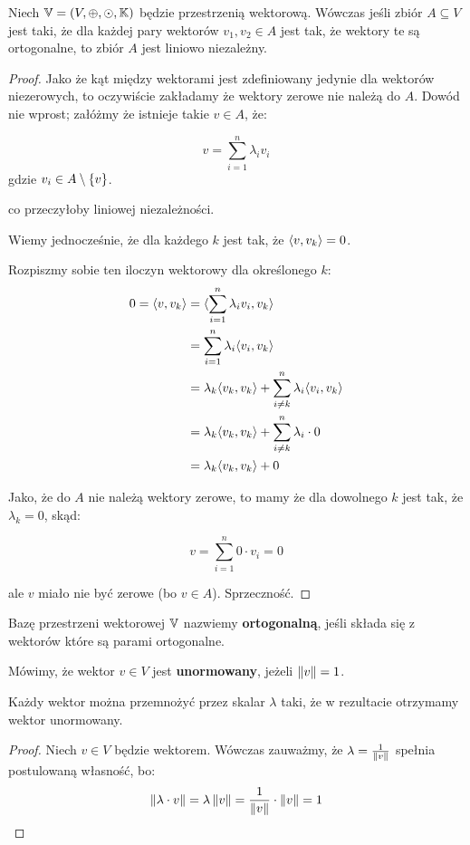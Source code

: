 \begin{theorem}
Niech \(\mathbb{V} = (V, \oplus, \odot, \mathbb{K})\) będzie przestrzenią wektorową. Wówczas jeśli zbiór \( A \subseteq V\) jest taki, że dla każdej pary wektorów \(v_1, v_2 \in A\) jest tak, że wektory te są ortogonalne, to zbiór \(A\) jest liniowo niezależny.
\end{theorem}
\begin{proof} 
Jako że kąt między wektorami jest zdefiniowany jedynie dla wektorów niezerowych, to oczywiście zakładamy że wektory zerowe nie należą do \(A\).
Dowód nie wprost; załóżmy że istnieje takie \(v \in A\), że: 

\[ 
    v = \sum_{i=1}^{n} \lambda_i v_i
\]
gdzie \(v_i \in A \setminus \set{v}\).

co przeczyłoby liniowej niezależności.

Wiemy jednocześnie, że dla każdego \(k\) jest tak, że \(\langle v, v_k \rangle = 0\). 

Rozpiszmy sobie ten iloczyn wektorowy dla określonego \(k\):
\begin{align*}
    0 = \langle v, v_k \rangle &= \langle \sum_{i=1}^{n} \lambda_i v_i, v_k \rangle \\ 
    &= \sum_{i=1}^{n} \lambda_i \langle v_i, v_k \rangle \\ 
    &= \lambda_k \langle v_k, v_k \rangle + \sum_{i \not = k}^{n} \lambda_i \langle v_i, v_k \rangle \\ 
    &= \lambda_k \langle v_k, v_k \rangle + \sum_{i \not = k}^{n} \lambda_i \cdot 0 \\ 
    &= \lambda_k \langle v_k, v_k \rangle + 0 \\ 
\end{align*}

Jako, że do \(A\) nie należą wektory zerowe, to mamy że dla dowolnego \(k\) jest tak, że \(\lambda_k = 0\), skąd:

\[ 
    v = \sum_{i=1}^{n} 0 \cdot v_i = 0
\]

ale \(v\) miało nie być zerowe (bo \(v \in A\)). Sprzeczność.

\end{proof}

\begin{definition}
Bazę przestrzeni wektorowej \(\mathbb{V}\) nazwiemy \textbf{ortogonalną}, jeśli składa się z wektorów które są parami ortogonalne.
\end{definition}

\begin{definition}
Mówimy, że wektor \(v \in V\) jest \textbf{unormowany}, jeżeli \(\left\Vert v \right\Vert = 1\).
\end{definition}
\begin{fact}
Każdy wektor można przemnożyć przez skalar \(\lambda\) taki, że w rezultacie otrzymamy wektor unormowany. 
\end{fact}
\begin{proof}
Niech \(v \in V\) będzie wektorem. Wówczas zauważmy, że \(\lambda = \frac{1}{\left\Vert v \right\Vert}\) spełnia postulowaną własność, bo:
\[
    \left\Vert \lambda \cdot v \right\Vert = \lambda \left\Vert v \right\Vert = \frac{1}{\left\Vert v \right\Vert} \cdot \left\Vert v \right\Vert = 1
\]
\end{proof}


